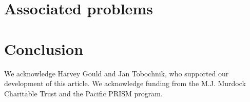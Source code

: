 \documentclass[prb,preprint]{revtex4}
\begin{document}
\section{Associated problems}



\section{Conclusion}




\begin{acknowledgments}

We acknowledge Harvey Gould and Jan Tobochnik, who supported our development of this article.  We acknowledge funding from the M.J. Murdock Charitable Trust and the Pacific PRISM program.

\end{acknowledgments}
\end{document}

